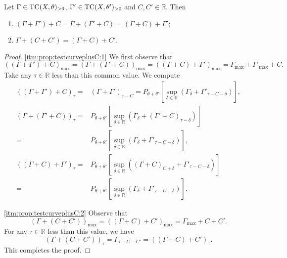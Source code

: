\begin{proposition}\label{prop:testcurveplusC}
    Let $\Gamma\in \mathrm{TC}(X,\theta)_{>0}$, $\Gamma'\in \mathrm{TC}(X,\theta')_{>0}$ and $C,C'\in \mathbb{R}$. Then
    \begin{enumerate}
        \item\label{itm:prop:testcurveplusC:1} $(\Gamma+\Gamma')+C=\Gamma+(\Gamma'+C)=(\Gamma+C)+\Gamma'$;
        \item\label{itm:prop:testcurveplusC:2} $\Gamma+(C+C')=(\Gamma+C)+C'$.
    \end{enumerate}
\end{proposition}
\begin{proof}
    \ref{itm:prop:testcurveplusC:1} We first observe that
    \[
    \left((\Gamma+\Gamma')+C\right)_{\max}=\left( \Gamma+(\Gamma'+C) \right)_{\max}=\left( (\Gamma+C)+\Gamma' \right)_{\max}=\Gamma_{\max}+\Gamma'_{\max}+C.
    \]
    Take any $\tau\in \mathbb{R}$ less than this common value. We compute
    \[
        \begin{aligned}
        \left((\Gamma+\Gamma')+C\right)_{\tau}=&(\Gamma+\Gamma')_{\tau-C}
        = P_{\theta+\theta'}\left[ \sup_{\delta\in \mathbb{R}}\left( \Gamma_\delta+\Gamma'_{\tau-C-\delta} \right) \right],\\
        \left( \Gamma+(\Gamma'+C) \right)_{\tau}=& P_{\theta+\theta'}\left[ \sup_{\delta\in \mathbb{R}}\left( \Gamma_\delta+(\Gamma'+C)_{\tau-\delta} \right) \right]\\
        =& P_{\theta+\theta'}\left[ \sup_{\delta\in \mathbb{R}}\left( \Gamma_\delta+\Gamma'_{\tau-C-\delta} \right) \right],\\
        \left((\Gamma+C)+\Gamma'\right)_{\tau}=& P_{\theta+\theta'}\left[ \sup_{\delta\in \mathbb{R}}\left( (\Gamma+C)_{C+\delta}+\Gamma'_{\tau-C-\delta} \right) \right]\\
        =& P_{\theta+\theta'}\left[ \sup_{\delta\in \mathbb{R}}\left( \Gamma_\delta+\Gamma'_{\tau-C-\delta} \right) \right].
        \end{aligned}
    \]

    \ref{itm:prop:testcurveplusC:2} Observe that
    \[
        \left( \Gamma+(C+C') \right)_{\max}=\left( (\Gamma+C)+C' \right)_{\max}=\Gamma_{\max}+C+C'.
    \]
    For any $\tau\in \mathbb{R}$ less than this value, we have
    \[
        \left( \Gamma+(C+C') \right)_{\tau}=\Gamma_{\tau-C-C'}=\left( (\Gamma+C)+C' \right)_{\tau}.
    \]
    This completes the proof.
\end{proof}

